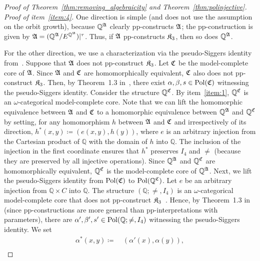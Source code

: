 \begin{proof}[Proof of Theorem~\ref{thm:removing_algebraicity} and Theorem~\ref{thm:polinjective}]
\textit{Proof of item~\ref{item:4}.}
%
One direction is simple  (and does not use the assumption on the orbit growth), because $\mathbb{Q}^{\mathfrak{A}}$ clearly pp-constructs $\mathfrak{A}$;
%
the pp-construction is given by $\mathfrak{A} = \smash{(\mathbb{Q}^{\mathfrak{A}}/E^{\mathbb{Q}^{\mathfrak{A}}})|^{\tau}}$. Thus, if $\mathfrak{A}$ pp-constructs $\mathfrak{K}_3$, then so does $\mathbb{Q}^{\mathfrak{A}}$. 

For the other direction, we use  a characterization via the pseudo-Siggers identity from~\cite[Theorems~1.3 and~3.4]{barto2019equations}.
%
Suppose that $\mathfrak{A}$ does not pp-construct $\mathfrak{K}_3$.
%
Let $\mathfrak{C}$ be the model-complete core of $\mathfrak{A}$.
%
Since $\mathfrak{A}$ and $\mathfrak{C}$ are homomorphically equivalent, $\mathfrak{C}$ also does not pp-construct 
$\mathfrak{K}_3$.
%
Then, by Theorem~1.3 in~\cite{barto2019equations}, there exist $\alpha,\beta,s\in \mathrm{Pol}(\mathfrak{C})$ witnessing the pseudo-Siggers identity. 
%
Consider the structure $\mathbb{Q}^{\mathfrak{C}}$.
%
By item~\ref{item:1}, $\mathbb{Q}^{\mathfrak{C}}$ is an $\omega$-categorical model-complete core.
%
Note that we can lift the homomorphic equivalence between $\mathfrak{A}$ and $\mathfrak{C}$ to a homomorphic equivalence between $\mathbb{Q}^{\mathfrak{A}}$ and $\mathbb{Q}^{\mathfrak{C}}$ by setting, for any homomorphism $h$ between $\mathfrak{A}$ and $\mathfrak{C}$ and irrespectively of its direction, $h^{\ast}(x,y)\coloneqq (e(x,y),h(y))$, where $e$ is an arbitrary injection from the Cartesian product of $\mathbb{Q}$ with the domain of $h$ into $\mathbb{Q}$.
%
The inclusion of the injection in the first coordinate ensures that $h^{\ast}$ preserves $I_4$ and $\neq$ (because they are preserved by all injective operations).
%
Since $\mathbb{Q}^{\mathfrak{A}}$ and $\mathbb{Q}^{\mathfrak{C}}$ are homomorphically equivalent, $\mathbb{Q}^{\mathfrak{C}}$ is the model-complete core of $\mathbb{Q}^{\mathfrak{A}}$.
%
Next, we lift the pseudo-Siggers identity from $\mathrm{Pol}(\mathfrak{C})$ to $\mathrm{Pol}(\mathbb{Q}^{\mathfrak{C}})$.
%  
Let $e$ be an arbitrary injection from $\mathbb{Q}\times C$ into $\mathbb{Q}$.
%
The structure $(\mathbb{Q};\neq, I_4)$ is an $\omega$-categorical model-complete core that does not pp-construct  $\mathfrak{K}_3$~\cite[Theorems~12.0.1,~12.7.3,~12.9.2, and Corollary~6.4.4]{bodirsky2021complexity}. 
%
Hence, by Theorem~1.3 in~\cite{barto2019equations} (since pp-constructions are more general than pp-interpretations with parameters), there are  $\alpha',\beta',s'\in \mathrm{Pol}(\mathbb{Q};\neq, I_4)$ witnessing the pseudo-Siggers identity.
%
We set 
% 
%
\begin{align*}
    \alpha^{\ast}(x,y)\coloneqq \ & (\alpha'(x),\alpha(y)), \\ 

\end{align*}
\end{proof}
